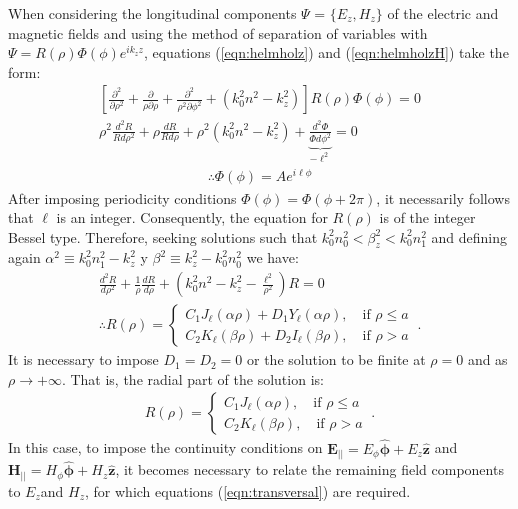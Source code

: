 When considering the longitudinal components $\Psi$ = $\{E_z, H_z\}$ of the electric and magnetic fields and using the method of separation of variables with $\Psi =  R(\rho)\Phi(\phi) e^{ik_z z} $,  equations (\ref{eqn:helmholz}) and (\ref{eqn:helmholzH}) take the form:
\begin{align}
	\left[\frac{\partial^2}{\partial \rho^2} + \frac{\partial}{\rho\partial \rho} + \frac{\partial^2}{\rho^2\partial \phi^2} +\left( k_0^2n^2 - k_z^2 \right)\right]  R(\rho)\Phi(\phi) = 0
	\nonumber
	\\
\rho^2\frac{d^2 R}{Rd\rho^2} + \rho\frac{dR}{Rd\rho} + \rho^2\left( k_0^2n^2 - k_z^2 \right) + \underbrace{\frac{d^2 \Phi}{\Phi d\phi^2}}_{-\ell^2} = 0
\nonumber
\end{align}
\vspace{-3em}
\begin{align}
\therefore \Phi(\phi) = A e^{i\ell\phi}
\nonumber
\end{align}
After imposing periodicity conditions  $\Phi(\phi)=\Phi(\phi + 2\pi)$, it necessarily follows that $\ell$ is an integer. Consequently, the equation for $R(\rho)$  is of the integer Bessel type. Therefore, seeking solutions such that $k_0^2 n_0^2 < \beta_z^2 < k_0^2 n_1^2$ and defining again $\alpha^2 \equiv k_0^2n_1^2 - k_z^2$ y $\beta^2\equiv k_z^2 - k_0^2n_0^2$ we have:
\begin{align}
	\frac{d^2 R}{d\rho^2} + \frac{1}{\rho}\frac{dR}{d\rho} + \left( k_0^2n^2 - k_z^2 -\frac{\ell^2}{\rho^2}\right)R  = 0
	\nonumber
	\\
	\therefore R(\rho) = 
	\left\{
	\begin{matrix}	
	C_1 J_\ell (\alpha\rho) + D_1 Y_\ell (\alpha\rho), \quad \text{if } \rho \le a  
	\\
	C_2 K_\ell (\beta\rho) + D_2 I_\ell (\beta\rho), \quad \text{if } \rho > a  
	\end{matrix}
	\right.
	\ . \nonumber
\end{align}
It is necessary to impose $D_1 = D_2 = 0$ or the solution to be finite at $\rho = 0$ and as $\rho \to +\infty$. That is, the radial part of the solution is:
\begin{align*}
 R(\rho) = 
	\left\{
	\begin{matrix}	
	C_1 J_\ell (\alpha\rho), \quad \text{if } \rho \le a  
	\\
	C_2 K_\ell (\beta\rho), \quad \text{if } \rho > a  
	\end{matrix}
	\right.
	\ . \nonumber
\end{align*}
In this case, to impose the continuity conditions on $\textbf{E}_{||} = E_\phi \boldsymbol{\hat{\phi}} + E_z \hat{\textbf{z}}$ and $\textbf{H}_{||}= H_\phi \hat{\boldsymbol{\phi}} + H_z \hat{\textbf{z}}$, it becomes necessary to relate the remaining field components to $E_z$​ and $H_z$​, for which equations (\ref{eqn:transversal}) are required.

